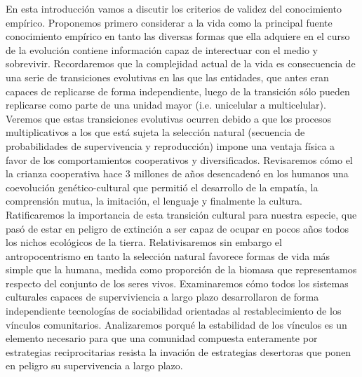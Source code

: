 \documentclass[a4paper,10pt]{book}
\begin{document}
En esta introducción vamos a discutir los criterios de validez del conocimiento empírico. %
Proponemos primero considerar a la vida como la principal fuente conocimiento empírico en tanto las diversas formas que ella adquiere en el curso de la evolución contiene información capaz de interectuar con el medio y sobrevivir.
Recordaremos que la complejidad actual de la vida es consecuencia de una serie de transiciones evolutivas en las que las entidades, que antes eran capaces de replicarse de forma independiente, luego de la transición sólo pueden replicarse como parte de una unidad mayor (i.e. unicelular a multicelular).
Veremos que estas transiciones evolutivas ocurren debido a que los procesos multiplicativos a los que está sujeta la selección natural (secuencia de probabilidades de supervivencia y reproducción) impone una ventaja física a favor de los comportamientos cooperativos y diversificados.
Revisaremos cómo el la crianza cooperativa hace 3 millones de años desencadenó en los humanos una coevolución genético-cultural que permitió el desarrollo de la empatía, la comprensión mutua, la imitación, el lenguaje y finalmente la cultura.
Ratificaremos la importancia de esta transición cultural para nuestra especie, que pasó de estar en peligro de extinción a ser capaz de ocupar en pocos años todos los nichos ecológicos de la tierra.
Relativisaremos sin embargo el antropocentrismo en tanto la selección natural favorece formas de vida más simple que la humana, medida como proporción de la biomasa que representamos respecto del conjunto de los seres vivos.
Examinaremos cómo todos los sistemas culturales capaces de superviviencia a largo plazo desarrollaron de forma independiente tecnologías de sociabilidad orientadas al restablecimiento de los vínculos comunitarios.
Analizaremos porqué la estabilidad de los vínculos es un elemento necesario para que una comunidad compuesta enteramente por estrategias reciprocitarias resista la invación de estrategias desertoras que ponen en peligro su supervivencia a largo plazo.
\end{document}
